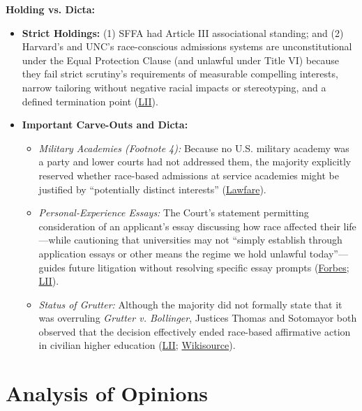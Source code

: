\documentclass[12pt]{article}
\begin{document}
\textbf{Holding vs. Dicta:}
\begin{itemize}
\item \textbf{Strict Holdings:} (1) SFFA had Article III associational standing; and (2) Harvard's and UNC's race-conscious admissions systems are unconstitutional under the Equal Protection Clause (and unlawful under Title VI) because they fail strict scrutiny's requirements of measurable compelling interests, narrow tailoring without negative racial impacts or stereotyping, and a defined termination point (\href{https://www.law.cornell.edu/supremecourt/text/20-1199}{LII}).
\item \textbf{Important Carve-Outs and Dicta:}
  \begin{itemize}
  \item \textit{Military Academies (Footnote 4):} Because no U.S. military academy was a party and lower courts had not addressed them, the majority explicitly reserved whether race-based admissions at service academies might be justified by ``potentially distinct interests'' (\href{https://www.lawfaremedia.org/article/the-national-security-footnote-in-the-affirmative-action-decision}{Lawfare}).
  \item \textit{Personal-Experience Essays:} The Court's statement permitting consideration of an applicant's essay discussing how race affected their life---while cautioning that universities may not ``simply establish through application essays or other means the regime we hold unlawful today''---guides future litigation without resolving specific essay prompts (\href{https://www.forbes.com/sites/michaeltnietzel/2023/07/02/three-of-the-bigger-puzzles-in-the-supreme-court-college-admissions-decision/}{Forbes}; \href{https://www.law.cornell.edu/supremecourt/text/20-1199}{LII}).
  \item \textit{Status of Grutter:} Although the majority did not formally state that it was overruling \textit{Grutter v. Bollinger}, Justices Thomas and Sotomayor both observed that the decision effectively ended race-based affirmative action in civilian higher education (\href{https://www.law.cornell.edu/supremecourt/text/20-1199}{LII}; \href{https://en.wikisource.org/wiki/Students_for_Fair_Admissions_v._President_and_Fellows_of_Harvard_College/Opinion_of_Justice_Thomas}{Wikisource}).
  \end{itemize}
\end{itemize}

\section{Analysis of Opinions}
\end{document}

